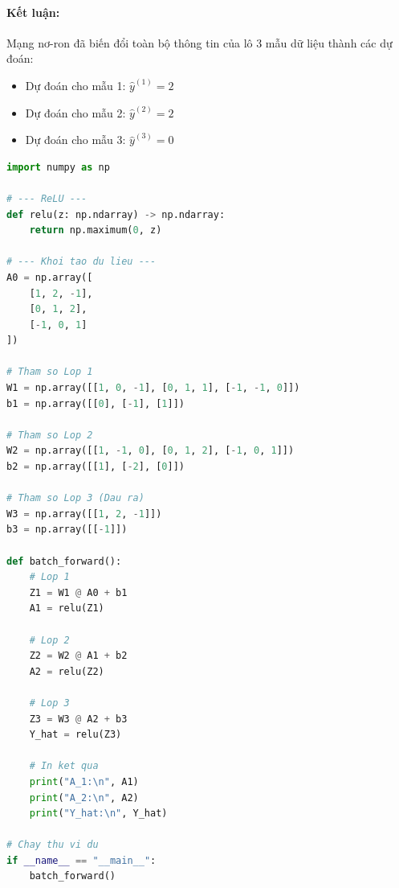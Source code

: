 \paragraph{Kết luận:\\} 
Mạng nơ-ron đã biến đổi toàn bộ thông tin của lô 3 mẫu dữ liệu thành các dự đoán:
\begin{itemize}
    \item Dự đoán cho mẫu 1: $\hat{y}^{(1)} = 2$
    \item Dự đoán cho mẫu 2: $\hat{y}^{(2)} = 2$
    \item Dự đoán cho mẫu 3: $\hat{y}^{(3)} = 0$
\end{itemize}
\begin{lstlisting}[caption={Mã Python lan truyền tiến cho một lô dữ liệu gồm 3 mẫu.}, language=Python]
import numpy as np

# --- ReLU ---
def relu(z: np.ndarray) -> np.ndarray:
    return np.maximum(0, z)

# --- Khoi tao du lieu ---
A0 = np.array([
    [1, 2, -1],
    [0, 1, 2],
    [-1, 0, 1]
])

# Tham so Lop 1
W1 = np.array([[1, 0, -1], [0, 1, 1], [-1, -1, 0]])
b1 = np.array([[0], [-1], [1]])

# Tham so Lop 2
W2 = np.array([[1, -1, 0], [0, 1, 2], [-1, 0, 1]])
b2 = np.array([[1], [-2], [0]])

# Tham so Lop 3 (Dau ra)
W3 = np.array([[1, 2, -1]])
b3 = np.array([[-1]])

def batch_forward():
    # Lop 1
    Z1 = W1 @ A0 + b1 
    A1 = relu(Z1)

    # Lop 2
    Z2 = W2 @ A1 + b2
    A2 = relu(Z2)

    # Lop 3
    Z3 = W3 @ A2 + b3
    Y_hat = relu(Z3)

    # In ket qua
    print("A_1:\n", A1)
    print("A_2:\n", A2)
    print("Y_hat:\n", Y_hat)

# Chay thu vi du
if __name__ == "__main__":
    batch_forward()
\end{lstlisting}